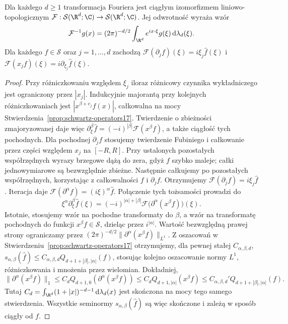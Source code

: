 \begin{twierdzenie}
\label{thm:fourier-schwartz17}
Dla każdego $d\ge1$ transformacja Fouriera jest ciągłym
izomorfizmem liniowo-topologicznym
$\mathcal F:\mathcal S(\R^d;\C)\to\mathcal S(\R^d;\C)$.
Jej odwrotność wyraża wzór
\[
\mathcal F^{-1}g(x)=(2\pi)^{-d/2}
\int_{\R^d}e^{ix\cdot\xi}g(\xi)\,
\mathrm d\lambda_d(\xi).
\]
Dla każdego $f\in\mathcal S$ oraz $j=1,\dots,d$ zachodzą
$\mathcal F(\partial_jf)(\xi)=i\xi_j\widehat f(\xi)$
i $\mathcal F(x_jf)(\xi)=i\partial_{\xi_j}\widehat f(\xi)$.
\end{twierdzenie}
\begin{proof}
Przy różniczkowaniu względem $\xi_j$ iloraz różnicowy
czynnika wykładniczego jest ograniczony przez $|x_j|$.
Indukcyjnie majorantą przy kolejnych różniczkowaniach
jest $|x^{\beta+e_j}f(x)|$, całkowalna na mocy
Stwierdzenia~\ref{prop:schwartz-operators17}.
Twierdzenie o zbieżności zmajoryzowanej daje więc
$\partial_\xi^\beta\widehat f=(-i)^{|\beta|}
\mathcal F(x^\beta f)$, a także ciągłość tych pochodnych.
Dla pochodnej $\partial_j f$ stosujemy twierdzenie Fubiniego
i całkowanie przez części względem $x_j$ na $[-R,R]$.
Przy ustalonych pozostałych współrzędnych wyrazy brzegowe
dążą do zera, gdyż $f$ szybko maleje; całki jednowymiarowe
są bezwzględnie zbieżne. Następnie całkujemy po pozostałych
współrzędnych, korzystając z całkowalności $f$ i $\partial_j f$.
Otrzymujemy $\mathcal F(\partial_j f)=i\xi_j\widehat f$.
Iteracja daje $\mathcal F(\partial^\alpha f)=(i\xi)^\alpha\widehat f$.
Połączenie tych tożsamości prowadzi do
\[
\xi^\alpha\partial_\xi^\beta\widehat f(\xi)
=(-i)^{|\alpha|+|\beta|}
\mathcal F\bigl(\partial^\alpha(x^\beta f)\bigr)(\xi).
\]
Istotnie, stosujemy wzór na pochodne transformaty
do $\beta$, a wzór na transformatę pochodnych do
funkcji $x^\beta f\in\mathcal S$, dzieląc przez
$i^{|\alpha|}$. Wartość bezwzględną prawej strony ograniczamy przez
$(2\pi)^{-d/2}\|\partial^\alpha(x^\beta f)\|_{L^1}$.
Z oszacowań w Stwierdzeniu~\ref{prop:schwartz-operators17}
otrzymujemy, dla pewnej stałej $C_{\alpha,\beta,d}$,
$s_{\alpha,\beta}(\widehat f)\le
C_{\alpha,\beta,d}Q_{d+1+|\beta|,|\alpha|}(f)$,
stosując kolejno oszacowanie normy $L^1$, różniczkowania
i mnożenia przez wielomian. Dokładniej,
\[
 \|\partial^\alpha(x^\beta f)\|_1
 \le C_d Q_{d+1,0}(\partial^\alpha(x^\beta f))
 \le C_d Q_{d+1,|\alpha|}(x^\beta f)
 \le C_{\alpha,\beta,d}'Q_{d+1+|\beta|,|\alpha|}(f).
\]
Tutaj $C_d=\int_{\R^d}(1+|x|)^{-d-1}\,\mathrm d\lambda_d(x)$
jest skończona na mocy tego samego stwierdzenia.
Wszystkie seminormy $s_{\alpha,\beta}(\widehat f)$ są więc
skończone i zależą w sposób ciągły od $f$.


\end{proof}
